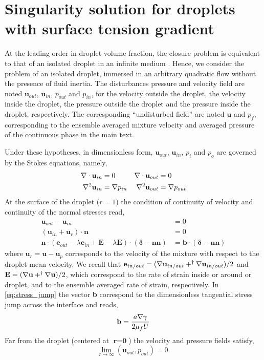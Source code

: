 \section{Singularity solution for droplets with surface tension gradient}
\label{ap:singularity_solution}
At the leading order in droplet volume fraction, the closure problem is equivalent to that of an isolated droplet in an infinite medium \citet{hinch1977averaged}. 
Hence, we consider the problem of an isolated droplet, immersed in an arbitrary quadratic flow without the presence of fluid inertia. 
The disturbances pressure and velocity field are noted $\textbf{u}_{out}$, $\textbf{u}_{in}$, $p_{out}$ and $p_{in}$, for the velocity outside the droplet, the velocity inside the droplet, the pressure outside the droplet and the pressure inside the droplet, respectively. 
The corresponding ``undisturbed field'' are noted $\textbf{u}$ and $p_f$, corresponding to the ensemble averaged mixture velocity and averaged pressure of the continuous phase in the main text. 

Under these hypotheses, in dimensionless form, $\textbf{u}_{out}$, $\textbf{u}_{in}$, $p_i$ and $p_o$ are governed by the Stokes equations, namely, 
\begin{align}
    \mathbf{\nabla}\cdot \textbf{u}_{in} &= 0 
    & \mathbf{\nabla}\cdot \textbf{u}_{out} &= 0 \\
     \mathbf{\nabla}^2 \textbf{u}_{in}  &= \mathbf{\nabla} p_{in} 
    & \mathbf{\nabla}^2 \textbf{u}_{out} &= \mathbf{\nabla} p_{out} 
\end{align}
At the surface of the droplet ($r=1$) the condition of continuity of velocity and continuity of the normal stresses read, 
\begin{align}
    \label{eq:vel_jump}
    \textbf{u}_{out} - \textbf{u}_{in} &= 0\\
    \label{eq:vel_jump2}
    (\textbf{u}_{in}  + \textbf{u}_r)\cdot \textbf{n}
    &= 0\\
    \mathbf{n}\cdot (\textbf{e}_{out} - \lambda \textbf{e}_{in}+\textbf{E} -\lambda\textbf{E} )\cdot (\bm\delta - \textbf{nn})
    &= 
    \textbf{b}\cdot (\bm\delta - \textbf{nn})
    \label{eq:stress_jump}
\end{align}
where $\textbf{u}_r = \textbf{u} - \textbf{u}_p$ corresponds to the velocity of the mixture with respect to the droplet mean velocity. 
We recall that $\textbf{e}_{in/out} = (\mathbf{\nabla} \textbf{u}_{in/out} + ^\dagger \mathbf{\nabla} \textbf{u}_{in/out})/2 $ and $\textbf{E} = (\mathbf{\nabla} \textbf{u} + ^\dagger \mathbf{\nabla} \textbf{u})/2$, which correspond to the rate of strain inside or around or droplet, and to the ensemble averaged rate of strain, respectively. 
In \ref{eq:stress_jump} the vector \textbf{b} correspond to the dimensionless tangential stress jump across the interface and reads, 
\begin{equation}
    \textbf{b}
    =
    \frac{a \mathbf{\nabla} \gamma}{2 \mu_f U}
\end{equation}
Far from the droplet (centered at $\textbf{r}=\textbf{0}$) the velocity and pressure fields satisfy, 
\begin{equation}
    \lim_{r\to \infty}(\textbf{u}_{out},p_{out}) = 0. 
\end{equation}

